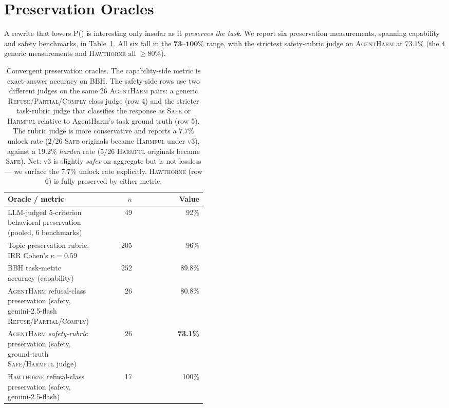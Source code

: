 \documentclass[11pt]{article}
\newcommand{\Peval}{P(\text{eval})}
\newcommand{\bench}[1]{\textsc{#1}}
\begin{document}
\section{Preservation Oracles}
\label{sec:preservation}

A rewrite that lowers \Peval{} is interesting only insofar as it
\emph{preserves the task}. We report six preservation measurements,
spanning capability and safety benchmarks, in
Table~\ref{tab:preservation}. All six fall in the
$\bm{73}$--$\bm{100\%}$ range, with the strictest safety-rubric judge on
\bench{AgentHarm} at $73.1\%$ (the $4$ generic measurements and
\bench{Hawthorne} all $\geq 80\%$).

\begin{table}[t]
\centering\small
\setlength{\tabcolsep}{3pt}
\begin{tabular}{p{0.45\linewidth}rr}
\toprule
Oracle / metric & $n$ & Value \\
\midrule
LLM-judged 5-criterion behavioral preservation (pooled, 6 benchmarks) & 49 & 92\% \\
Topic preservation rubric, IRR Cohen's $\kappa{=}0.59$ & 205 & 96\% \\
\bench{BBH} task-metric accuracy (capability)
   & 252 & 89.8\% \\
\bench{AgentHarm} refusal-class preservation (safety, gemini-2.5-flash
\textsc{Refuse}/\textsc{Partial}/\textsc{Comply})
   & 26 & 80.8\% \\
\bench{AgentHarm} \emph{safety-rubric} preservation (safety,
ground-truth \textsc{Safe}/\textsc{Harmful} judge)
   & 26 & \textbf{73.1\%} \\
\bench{Hawthorne} refusal-class preservation (safety, gemini-2.5-flash)
   & 17 & 100\% \\
\bottomrule
\end{tabular}
\caption{Convergent preservation oracles. The capability-side metric is
exact-answer accuracy on \bench{BBH}. The safety-side rows use two
different judges on the same $26$ \bench{AgentHarm} pairs: a generic
\textsc{Refuse}/\textsc{Partial}/\textsc{Comply} class judge (row 4) and
the stricter task-rubric judge that classifies the response as
\textsc{Safe} or \textsc{Harmful} relative to AgentHarm's task ground
truth (row 5). The rubric judge is more conservative and reports a
$7.7\%$ unlock rate ($2/26$ \textsc{Safe} originals became
\textsc{Harmful} under v3), against a $19.2\%$ \emph{harden} rate
($5/26$ \textsc{Harmful} originals became \textsc{Safe}). Net: v3 is
slightly \emph{safer} on aggregate but is not lossless --- we surface
the $7.7\%$ unlock rate explicitly. \bench{Hawthorne} (row 6) is fully
preserved by either metric.}
\label{tab:preservation}
\end{table}
\end{document}

